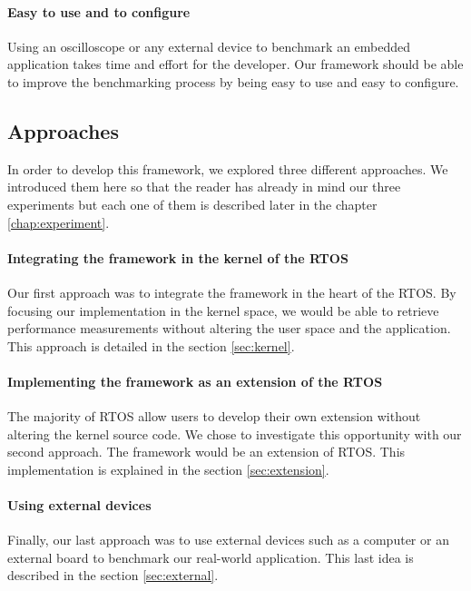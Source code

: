 \paragraph{Easy to use and to configure}
Using an oscilloscope or any external device to benchmark an embedded application takes time and effort for the developer.
Our framework should be able to improve the benchmarking process by being easy to use and easy to configure.

\subsection{Approaches}

In order to develop this framework, we explored three different approaches.
We introduced them here so that the reader has already in mind our three experiments but each one of them is described later in the chapter \ref{chap:experiment}.

\paragraph{Integrating the framework in the kernel of the RTOS}
Our first approach was to integrate the framework in the heart of the RTOS.
By focusing our implementation in the kernel space, we would be able to retrieve performance measurements without altering the user space and the application.
This approach is detailed in the section \ref{sec:kernel}.

\paragraph{Implementing the framework as an extension of the RTOS}
The majority of RTOS allow users to develop their own extension without altering the kernel source code.
We chose to investigate this opportunity with our second approach.
The framework would be an extension of RTOS.
This implementation is explained in the section \ref{sec:extension}.

\paragraph{Using external devices}
Finally, our last approach was to use external devices such as a computer or an external board to benchmark our real-world application.
This last idea is described in the section \ref{sec:external}.
